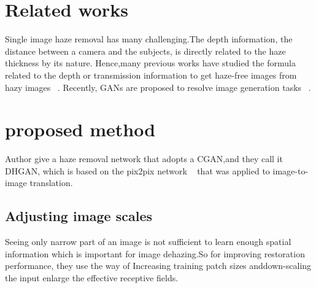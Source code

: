 \documentclass[10pt,twocolumn,letterpaper]{article}
\begin{document}
\section{Related works}
Single image haze removal has many challenging.The depth information, the distance between a camera and the subjects,
is directly related to the haze thickness by its nature. Hence,many previous works have studied the formula related to the depth or transmission information to get haze-free images from hazy images ~\cite{Single2011_5,semi2010_6,Single2013_7,Efficient2013_8}.
Recently, GANs are proposed to resolve image
generation tasks ~\cite{Unsupervised2017_9,Unpaired2017_10}.

\section{proposed method}
	Author give a haze removal network that adopts a CGAN,and they call it DHGAN, which is based on the pix2pix network ~\cite{Image2017_11} that was applied to image-to-image translation.
\subsection{Adjusting image scales}
Seeing only narrow part of an image is not sufficient to learn enough spatial information which is important for image dehazing.So for improving restoration performance, they use the way of Increasing training patch sizes anddown-scaling the input enlarge the effective receptive fields.
\end{document}
